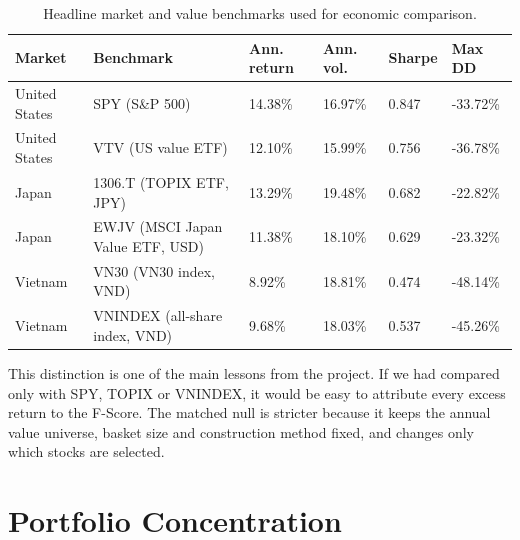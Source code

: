 \documentclass[11pt,a4paper]{report}
\numberwithin{figure}{chapter}
\numberwithin{table}{chapter}
\numberwithin{equation}{chapter}
\begin{document}
\begin{table}[H]
\centering
\scriptsize
\caption{Headline market and value benchmarks used for economic comparison.}
\label{tab:benchmark_summary}

\setlength{\tabcolsep}{3pt}

\begin{tabular}{
@{}
M{0.12\textwidth}
M{0.35\textwidth}
M{0.14\textwidth}
M{0.12\textwidth}
M{0.10\textwidth}
M{0.12\textwidth}
@{}
}
\hline
\textbf{Market} &
\textbf{Benchmark} &
\textbf{Ann. return} &
\textbf{Ann. vol.} &
\textbf{Sharpe} &
\textbf{Max DD} \\
\hline

United States
& SPY (S\&P 500)
& 14.38\%
& 16.97\%
& 0.847
& -33.72\% \\
\hline{}

United States
& VTV (US value ETF)
& 12.10\%
& 15.99\%
& 0.756
& -36.78\% \\
\hline{}

Japan
& 1306.T (TOPIX ETF, JPY)
& 13.29\%
& 19.48\%
& 0.682
& -22.82\% \\
\hline{}

Japan
& EWJV (MSCI Japan Value ETF, USD)
& 11.38\%
& 18.10\%
& 0.629
& -23.32\% \\
\hline{}

Vietnam
& VN30 (VN30 index, VND)
& 8.92\%
& 18.81\%
& 0.474
& -48.14\% \\
\hline{}

Vietnam
& VNINDEX (all-share index, VND)
& 9.68\%
& 18.03\%
& 0.537
& -45.26\% \\

\hline
\end{tabular}
\end{table}

This distinction is one of the main lessons from the project. If we had compared only with SPY, TOPIX or VNINDEX, it would be easy to attribute every excess return to the F-Score. The matched null is stricter because it keeps the annual value universe, basket size and construction method fixed, and changes only which stocks are selected.

\section{Portfolio Concentration}
\end{document}
